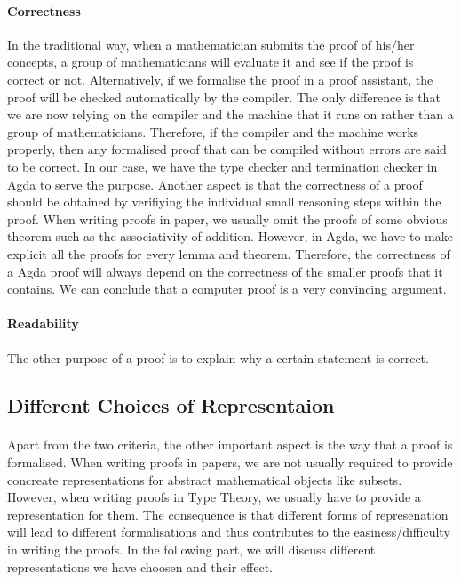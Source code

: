 \documentclass[twoside,openright,final]{bhamthesis}
\begin{document}
\paragraph{Correctness} In the traditional way, when a mathematician
submits the proof of his/her concepts, a group of mathematicians will
evaluate it and see if the proof is correct or not. Alternatively, if we
formalise the proof in a proof assistant, the proof will be checked
automatically by the compiler. The only difference is that we are now
relying on the compiler and the machine that it runs on rather
than a group of mathematicians. Therefore, if the compiler and the
machine works properly, then any formalised proof that
can be compiled without errors are said to be correct. In our case, we
have the type checker and termination checker in Agda to serve the
purpose. Another aspect is that the correctness of a proof should be
obtained by verifiying the individual small reasoning steps within the
proof. When writing proofs in paper, we usually omit the proofs of
some obvious theorem such as the associativity of addition. However,
in Agda, we have to make explicit all the proofs for every lemma and
theorem. Therefore, the correctness of a Agda proof will always depend on the
correctness of the smaller proofs that it contains. We can conclude
that a computer proof is a very convincing argument. 

\paragraph{Readability} The other purpose of a proof is to explain why
a certain statement is correct. 


\subsection{Different Choices of Representaion}
\paragraph{} Apart from the two criteria, the other important aspect
is the way that a proof is formalised. When
writing proofs in papers, we are not usually required to provide
concreate representations for abstract mathematical objects like
subsets. However, when writing proofs in Type Theory, we usually have to provide a
representation for them. The consequence is that different forms of represenation
will lead to different formalisations and thus contributes to the
easiness/difficulty in writing the proofs. In the following part, we
will discuss different representations we have choosen and their
effect. 
\end{document}
